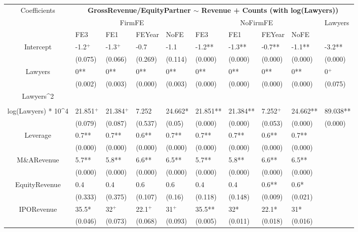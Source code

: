 \documentclass{article}
\begin{document}
\begin{table}[H]
\centering
\begin{tabular}{|clllllllll|}
\hline
\multirow{3}{*}{Coefficients} & \multicolumn{9}{c|}{\textbf{GrossRevenue/EquityPartner $\sim$ Revenue + Counts (with log(Lawyers))}} \\
\cline{2-10}
& \multicolumn{4}{c}{FirmFE} & \multicolumn{4}{c}{NoFirmFE} & \multirow{2}{*}{Lawyers} \\
\cline{2-9}
& FE3 & FE1 & FEYear & NoFE & FE3 & FE1 & FEYear & NoFE &  \\
\hline
 
Intercept & -1.2$^{+}$ & -1.3$^{+}$ & -0.7 & -1.1 & -1.2** & -1.3** & -0.7** & -1.1** & -3.2** \\ 
   & (0.075) & (0.066) & (0.269) & (0.114) & (0.000) & (0.000) & (0.000) & (0.000) & (0.000) \\ 
  Lawyers & 0** & 0** & 0** & 0** & 0** & 0** & 0** & 0** & 0$^{+}$ \\ 
   & (0.002) & (0.003) & (0.000) & (0.003) & (0.000) & (0.000) & (0.000) & (0.000) & (0.075) \\ 
  Lawyers^2 &  &  &  &  &  &  &  &  &  \\ 
   &  &  &  &  &  &  &  &  &  \\ 
  log(Lawyers) * 10^4 & 21.851$^{+}$ & 21.384$^{+}$ & 7.252 & 24.662* & 21.851** & 21.384** & 7.252$^{+}$ & 24.662** & 89.038** \\ 
   & (0.079) & (0.087) & (0.537) & (0.05) & (0.000) & (0.000) & (0.053) & (0.000) & (0.000) \\ 
  Leverage & 0.7** & 0.7** & 0.6** & 0.7** & 0.7** & 0.7** & 0.6** & 0.7** &  \\ 
   & (0.000) & (0.000) & (0.000) & (0.000) & (0.000) & (0.000) & (0.000) & (0.000) &  \\ 
  M\&ARevenue & 5.7** & 5.8** & 6.6** & 6.5** & 5.7** & 5.8** & 6.6** & 6.5** &  \\ 
   & (0.000) & (0.000) & (0.000) & (0.000) & (0.000) & (0.000) & (0.000) & (0.000) &  \\ 
  EquityRevenue & 0.4 & 0.4 & 0.6 & 0.6 & 0.4 & 0.4 & 0.6** & 0.6* &  \\ 
   & (0.333) & (0.375) & (0.107) & (0.16) & (0.118) & (0.148) & (0.009) & (0.021) &  \\ 
  IPORevenue & 35.5* & 32$^{+}$ & 22.1$^{+}$ & 31$^{+}$ & 35.5** & 32* & 22.1* & 31* &  \\ 
   & (0.046) & (0.073) & (0.068) & (0.093) & (0.005) & (0.011) & (0.018) & (0.016) &  \\ 

\end{tabular}
\end{table}
\end{document}

